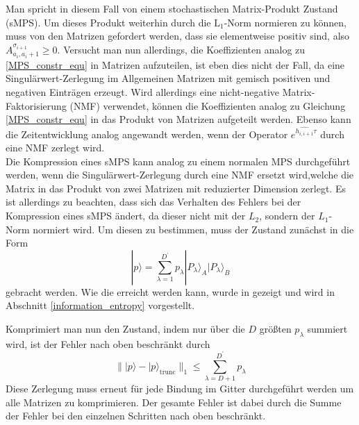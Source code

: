 \documentclass[10pt,a4paper]{report}
\begin{document}
Man spricht in diesem Fall von einem stochastischen Matrix-Produkt Zustand (sMPS). Um dieses Produkt weiterhin durch die $\text{L}_1$-Norm normieren zu können, muss von den Matrizen gefordert werden, dass sie elementweise positiv sind, also $A_{a_i,a_i+1}^{\sigma_{i+1}}\geq 0$. 
Versucht man nun allerdings, die Koeffizienten analog zu \ref{MPS_constr_equ} in Matrizen aufzuteilen, ist eben dies nicht der Fall, da eine Singulärwert-Zerlegung im Allgemeinen Matrizen mit gemisch positiven und negativen Einträgen erzeugt. Wird allerdings eine nicht-negative Matrix-Faktorisierung (NMF) verwendet, können die Koeffizienten analog zu Gleichung \ref{MPS_constr_equ} in das Produkt von Matrizen aufgeteilt werden. Ebenso kann die Zeitentwicklung analog angewandt werden, wenn der Operator $e^{\hat{h_{i,i+1}}\tau}$ durch eine NMF zerlegt wird.\\


Die Kompression eines sMPS kann analog zu einem normalen MPS durchgeführt werden, wenn die Singulärwert-Zerlegung durch eine NMF ersetzt wird,welche die Matrix in das Produkt von zwei Matrizen mit reduzierter Dimension zerlegt. Es ist allerdings zu beachten, dass sich das Verhalten des Fehlers bei der Kompression eines sMPS ändert, da dieser nicht mit der $L_2$, sondern der $L_1$-Norm normiert wird. Um diesen zu bestimmen, muss der Zustand zunächst in die Form
\begin{equation}
|p\rangle=\sum_{\lambda=1}^{D^{\prime}}p_{\lambda}|P_{\lambda}\rangle_A|P_{\lambda}\rangle_B
\end{equation}
gebracht werden.\cite{MPS-vs-sMPS} Wie die erreicht werden kann, wurde in \cite{sMPS} gezeigt und wird in Abschnitt \ref{information_entropy} vorgestellt.

Komprimiert man nun den Zustand, indem nur über die $D$ größten $p_{\lambda}$ summiert wird, ist der Fehler nach oben beschränkt durch
\begin{equation}
\parallel|p\rangle-|p\rangle_{\text{trunc}}\parallel_1\leq\sum_{\lambda=D+1}^{D^{\prime}}p_{\lambda}
\end{equation}
Diese Zerlegung muss erneut für jede Bindung im Gitter durchgeführt werden um alle Matrizen zu komprimieren. Der gesamte Fehler ist dabei durch die Summe der Fehler bei den einzelnen Schritten nach oben beschränkt.\\
\end{document}
